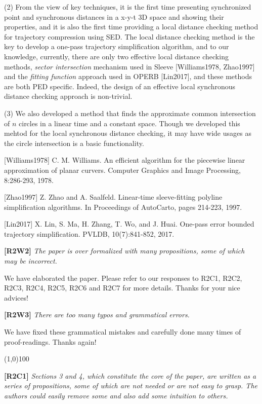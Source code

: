 \documentclass{letter}
\begin{document}
{(2) From the view of key techniques, it is the first time presenting synchronized point and synchronous distances in a x-y-t 3D space and showing their properties, and it is also the first time providing a local distance checking method for trajectory compression using SED. The local distance checking method is the key to develop a one-pass trajectory simplification algorithm, and to our knowledge, currently, there are only two effective local distance checking methods, \textit{sector intersection} mechanism used in Sleeve [Williams1978, Zhao1997] and the \textit{fitting function} approach used in OPERB [Lin2017], and these methods are both PED specific. Indeed, the design of an effective local synchronous distance checking approach is non-trivial.}

(3) We also developed a method that finds the approximate common intersection of $n$ circles in a linear time and a constant space. Though we developed this mehtod for the local synchronous distance checking, it may have wide usages as the circle intersection is a basic functionality.

[Williams1978] C. M. Williams. An efficient algorithm for the piecewise linear approximation of planar curvers. Computer Graphics and Image Processing, 8:286-293, 1978.

[Zhao1997]  Z. Zhao and A. Saalfeld. Linear-time sleeve-fitting polyline simplification algorithms. In Proceedings of AutoCarto, pages 214-223, 1997.

[Lin2017] X. Lin, S. Ma, H. Zhang, T. Wo, and J. Huai. One-pass error bounded trajectory simplification. PVLDB, 10(7):841-852, 2017.

\textbf{[R2W2]} \emph{The paper is over formalized with many propositions, some of which may be incorrect.}

We have elaborated the paper. Please refer to our responses to R2C1, R2C2, R2C3, R2C4, R2C5, R2C6 and R2C7 for more details. Thanks for your nice advices!

\textbf{[R2W3]} \emph{There are too many typos and grammatical errors.}

We have fixed these grammatical mistakes and carefully done many times of proof-readings. Thanks again!

\line(1,0){100}

\textbf{[R2C1]} \emph{Sections 3 and 4, which constitute the core of the paper, are written as a series of propositions, some of which are not needed or are not easy to grasp. The authors could easily remove some and also add some intuition to others.}
\end{document}
